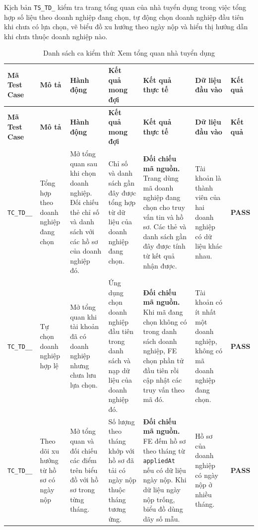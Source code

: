 \begin{landscape}
Kịch bản \texttt{TS\_\allowbreak TD\_} kiểm tra trang tổng quan của nhà tuyển dụng trong việc tổng hợp số liệu theo doanh nghiệp đang chọn, tự động chọn doanh nghiệp đầu tiên khi chưa có lựa chọn, vẽ biểu đồ xu hướng theo ngày nộp và hiển thị hướng dẫn khi chưa thuộc doanh nghiệp nào.

{
\fontsize{9.5}{11.5}\selectfont
\setlength{\tabcolsep}{3pt}
\renewcommand{\arraystretch}{1.2}
\begin{longtable}{|>{\raggedright\arraybackslash}p{2.1cm}|>{\raggedright\arraybackslash}p{2.8cm}|>{\raggedright\arraybackslash}p{3.8cm}|>{\raggedright\arraybackslash}p{4.0cm}|>{\raggedright\arraybackslash}p{5.0cm}|>{\raggedright\arraybackslash}p{3.2cm}|>{\centering\arraybackslash}p{1.3cm}|}
    \caption{Danh sách ca kiểm thử: Xem tổng quan nhà tuyển dụng} \label{tab:ts-td-07} \\
    \hline
    \textbf{Mã Test Case} & \textbf{Mô tả} & \textbf{Hành động} & \textbf{Kết quả mong đợi} & \textbf{Kết quả thực tế} & \textbf{Dữ liệu đầu vào} & \textbf{Kết quả} \\
    \hline
    \endfirsthead
    \hline
    \textbf{Mã Test Case} & \textbf{Mô tả} & \textbf{Hành động} & \textbf{Kết quả mong đợi} & \textbf{Kết quả thực tế} & \textbf{Dữ liệu đầu vào} & \textbf{Kết quả} \\
    \hline
    \endhead
    \hline
    \endfoot
    \hline
    \endlastfoot
    \texttt{TC\_\allowbreak TD\_\allowbreak 07\_\allowbreak 01} & Tổng hợp theo doanh nghiệp đang chọn & Mở tổng quan sau khi chọn doanh nghiệp. Đối chiếu thẻ chỉ số và danh sách với các hồ sơ của doanh nghiệp đó. & Chỉ số và danh sách gần đây được tổng hợp từ dữ liệu của doanh nghiệp đang chọn. & \textbf{Đối chiếu mã nguồn.} Trang dùng mã doanh nghiệp đang chọn cho truy vấn tin và hồ sơ. Các thẻ và danh sách gần đây được tính từ kết quả nhận được. & Tài khoản là thành viên của hai doanh nghiệp có dữ liệu khác nhau. & \textbf{PASS} \\
    \hline
    \texttt{TC\_\allowbreak TD\_\allowbreak 07\_\allowbreak 02} & Tự chọn doanh nghiệp hợp lệ & Mở tổng quan khi tài khoản đã có doanh nghiệp nhưng chưa lưu lựa chọn. & Ứng dụng chọn doanh nghiệp đầu tiên trong danh sách và nạp dữ liệu của doanh nghiệp đó. & \textbf{Đối chiếu mã nguồn.} Khi mã đang chọn không có trong danh sách doanh nghiệp, FE chọn phần tử đầu tiên rồi cập nhật các truy vấn theo mã đó. & Tài khoản có ít nhất một doanh nghiệp, không có mã doanh nghiệp đang chọn. & \textbf{PASS} \\
    \hline
    \texttt{TC\_\allowbreak TD\_\allowbreak 07\_\allowbreak 03} & Theo dõi xu hướng từ hồ sơ có ngày nộp & Mở tổng quan và đối chiếu các điểm trên biểu đồ với hồ sơ trong từng tháng. & Số lượng theo tháng khớp với hồ sơ đã tải có ngày nộp thuộc tháng tương ứng. & \textbf{Đối chiếu mã nguồn.} FE đếm hồ sơ theo tháng từ \texttt{appliedAt} nếu có dữ liệu ngày nộp. Khi dữ liệu ngày nộp trống, biểu đồ dùng dãy số mẫu. & Hồ sơ của doanh nghiệp có ngày nộp ở nhiều tháng. & \textbf{PASS} \\

\end{longtable}}
\end{landscape}
